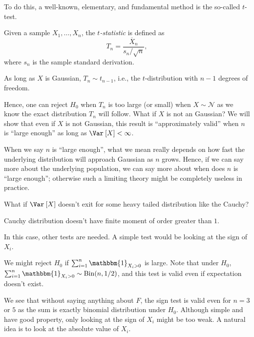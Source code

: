 To do this, a well-known, elementary, and fundamental method is the so-called \(t\)-test.

\begin{definition}[\(t\)-statistic]\label{def:t-statistic}
	Given a sample \(X_1, \dots , X_n\), the \emph{\(t\)-statistic} is defined as
	\[
		T_n = \frac{\overline{X} _n}{s_n / \sqrt{n} },
	\]
	where \(s_n\) is the sample standard derivation.
\end{definition}

\begin{note}
	As long as \(X\) is Gaussian, \(T_n \sim t_{n-1}\), i.e., the \(t\)-distribution with \(n-1\) degrees of freedom.
\end{note}

Hence, one can reject \(H_0\) when \(T_n\) is too large (or small) when \(X \sim \mathcal{N} \) as we know the exact distribution \(T_n\) will follow. What if \(X\) is not an Gaussian? We will show that even if \(X\) is not Gaussian, this result is ``approximately valid'' when \(n\) is ``large enough'' as long as \(\Var_{}\left[X \right] < \infty \).

\begin{remark}
	When we say \(n\) is ``large enough'', what we mean really depends on how fast the underlying distribution will approach Gaussian as \(n\) grows. Hence, if we can say more about the underlying population, we can say more about when does \(n\) is ``large enough''; otherwise such a limiting theory might be completely useless in practice.
\end{remark}

What if \(\Var_{}\left[X \right] \) doesn't exit for some heavy tailed distribution like the Cauchy?

\begin{eg}
	Cauchy distribution doesn't have finite moment of order greater than \(1\).
\end{eg}

In this case, other tests are needed. A simple test would be looking at the sign of \(X_i\).

\begin{eg}
	We might reject \(H_0\) if \(\sum_{i=1}^{n} \mathbbm{1}_{X_i > 0} \) is large. Note that under \(H_0\), \(\sum_{i=1}^{n} \mathbbm{1}_{X_i > 0} \sim \operatorname{Bin}(n, 1/2) \), and this test is valid even if expectation doesn't exist.
\end{eg}

We see that without saying anything about \(F\), the sign test is valid even for \(n = 3\) or \(5\) as the sum is exactly binomial distribution under \(H_0\). Although simple and have good property, only looking at the sign of \(X_i\) might be too weak. A natural idea is to look at the absolute value of \(X_i\).

